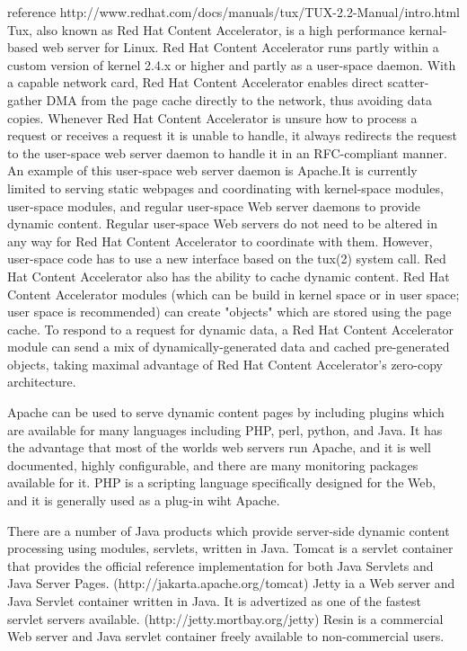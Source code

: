 {reference
http://www.redhat.com/docs/manuals/tux/TUX-2.2-Manual/intro.html} Tux,
also known as Red Hat Content Accelerator, is a high performance
kernal-based web server for Linux. Red Hat Content Accelerator runs
partly within a custom version of kernel 2.4.x or higher and partly as
a user-space daemon. With a capable network card, Red Hat Content
Accelerator enables direct scatter-gather DMA from the page cache
directly to the network, thus avoiding data copies. Whenever Red Hat
Content Accelerator is unsure how to process a request or receives a
request it is unable to handle, it always redirects the request to the
user-space web server daemon to handle it in an RFC-compliant
manner. An example of this user-space web server daemon is Apache.It
is currently limited to serving static webpages and coordinating with
kernel-space modules, user-space modules, and regular user-space Web
server daemons to provide dynamic content. Regular user-space Web
servers do not need to be altered in any way for Red Hat Content
Accelerator to coordinate with them. However, user-space code has to
use a new interface based on the tux(2) system call. Red Hat Content
Accelerator also has the ability to cache dynamic content. Red Hat
Content Accelerator modules (which can be build in kernel space or in
user space; user space is recommended) can create "objects" which are
stored using the page cache. To respond to a request for dynamic data,
a Red Hat Content Accelerator module can send a mix of
dynamically-generated data and cached pre-generated objects, taking
maximal advantage of Red Hat Content Accelerator's zero-copy
architecture.


Apache can be used to serve dynamic content pages by including plugins
which are available for many languages including PHP, perl, python,
and Java. It has the advantage that most of the worlds web servers run
Apache, and it is well documented, highly configurable, and there are
many monitoring packages available for it.  PHP is a scripting
language specifically designed for the Web, and it is generally used
as a plug-in wiht Apache.

There are a number of Java products which provide server-side dynamic
content processing using modules, servlets, written in Java. Tomcat is
a servlet container that provides the official reference
implementation for both Java Servlets and Java Server
Pages. (http://jakarta.apache.org/tomcat) Jetty ia a Web server and
Java Servlet container written in Java. It is advertized as one of the
fastest servlet servers available. (http://jetty.mortbay.org/jetty)
Resin is a commercial Web server and Java servlet container freely
available to non-commercial users.

